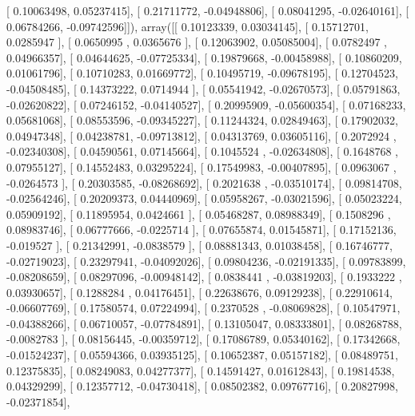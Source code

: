 \documentclass{article}
\begin{document}
       [ 0.10063498,  0.05237415],
       [ 0.21711772, -0.04948806],
       [ 0.08041295, -0.02640161],
       [ 0.06784266, -0.09742596]]), array([[ 0.10123339,  0.03034145],
       [ 0.15712701,  0.0285947 ],
       [ 0.0650995 ,  0.0365676 ],
       [ 0.12063902,  0.05085004],
       [ 0.0782497 ,  0.04966357],
       [ 0.04644625, -0.07725334],
       [ 0.19879668, -0.00458988],
       [ 0.10860209,  0.01061796],
       [ 0.10710283,  0.01669772],
       [ 0.10495719, -0.09678195],
       [ 0.12704523, -0.04508485],
       [ 0.14373222,  0.0714944 ],
       [ 0.05541942, -0.02670573],
       [ 0.05791863, -0.02620822],
       [ 0.07246152, -0.04140527],
       [ 0.20995909, -0.05600354],
       [ 0.07168233,  0.05681068],
       [ 0.08553596, -0.09345227],
       [ 0.11244324,  0.02849463],
       [ 0.17902032,  0.04947348],
       [ 0.04238781, -0.09713812],
       [ 0.04313769,  0.03605116],
       [ 0.2072924 , -0.02340308],
       [ 0.04590561,  0.07145664],
       [ 0.1045524 , -0.02634808],
       [ 0.1648768 ,  0.07955127],
       [ 0.14552483,  0.03295224],
       [ 0.17549983, -0.00407895],
       [ 0.0963067 , -0.0264573 ],
       [ 0.20303585, -0.08268692],
       [ 0.2021638 , -0.03510174],
       [ 0.09814708, -0.02564246],
       [ 0.20209373,  0.04440969],
       [ 0.05958267, -0.03021596],
       [ 0.05023224,  0.05909192],
       [ 0.11895954,  0.0424661 ],
       [ 0.05468287,  0.08988349],
       [ 0.1508296 ,  0.08983746],
       [ 0.06777666, -0.0225714 ],
       [ 0.07655874,  0.01545871],
       [ 0.17152136, -0.019527  ],
       [ 0.21342991, -0.0838579 ],
       [ 0.08881343,  0.01038458],
       [ 0.16746777, -0.02719023],
       [ 0.23297941, -0.04092026],
       [ 0.09804236, -0.02191335],
       [ 0.09783899, -0.08208659],
       [ 0.08297096, -0.00948142],
       [ 0.0838441 , -0.03819203],
       [ 0.1933222 ,  0.03930657],
       [ 0.1288284 ,  0.04176451],
       [ 0.22638676,  0.09129238],
       [ 0.22910614, -0.06607769],
       [ 0.17580574,  0.07224994],
       [ 0.2370528 , -0.08069828],
       [ 0.10547971, -0.04388266],
       [ 0.06710057, -0.07784891],
       [ 0.13105047,  0.08333801],
       [ 0.08268788, -0.0082783 ],
       [ 0.08156445, -0.00359712],
       [ 0.17086789,  0.05340162],
       [ 0.17342668, -0.01524237],
       [ 0.05594366,  0.03935125],
       [ 0.10652387,  0.05157182],
       [ 0.08489751,  0.12375835],
       [ 0.08249083,  0.04277377],
       [ 0.14591427,  0.01612843],
       [ 0.19814538,  0.04329299],
       [ 0.12357712, -0.04730418],
       [ 0.08502382,  0.09767716],
       [ 0.20827998, -0.02371854],
\end{document}

